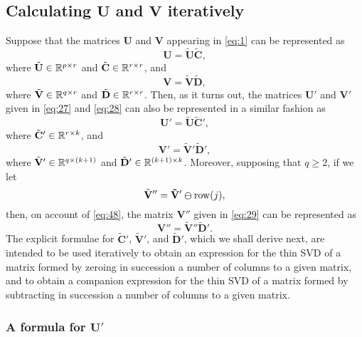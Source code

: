 \documentclass[11pt,a4paper]{article}
\theoremstyle{break}
\numberwithin{dummy}{section}
\theoremstyle{plain}
\theoremstyle{plain}
\theoremstyle{plain}
\theoremstyle{plain}
\theoremstyle{plain}
\theoremstyle{MyNonumberplain}
\newcommand{\0}{\M{0}}
\newcommand{\M}[1]{\mathbf{#1}}
\newcommand{\Mt}[1]{\tilde{\M{#1}}}
\newcommand{\R}{\mathbb{R}}
\newcommand{\Mat}[2]{%
  \ifthenelse{\equal{#2}{1}}
  {\R^{#1}}
  {\R^{#1 \times #2}}
}
\newcommand{\delrow}[2]{\M{#1} \varominus \mathrm{row}(#2)}
\begin{document}
\subsection{Calculating $\M{U}$ and $\M{V}$ iteratively}

Suppose that the matrices $\M{U}$ and $\M{V}$ appearing in \eqref{eq:1} can be represented as
\begin{equation}
  \label{eq:45}
  \M{U} = \Mt{U} \Mt{C},
\end{equation}
where $\Mt{U} \in \Mat{p}{r}$ and $\Mt{C} \in \Mat{r}{r}$, and
\begin{equation}
  \label{eq:46}
  \M{V} = \Mt{V} \Mt{D}, 
\end{equation}
where $\Mt{V} \in \Mat{q}{r}$ and $\Mt{D} \in \Mat{r}{r}$.  Then, as it turns out, the matrices $\M{U}'$ and $\M{V}'$ given in \eqref{eq:27} and \eqref{eq:28} can also be represented in a similar fashion as
\begin{equation}
  \label{eq:47}
  \M{U}' = \Mt{U} \Mt{C}', 
\end{equation}
where $\Mt{C}' \in \Mat{r}{k}$, and
\begin{equation}
  \label{eq:48}
  \M{V}' = \Mt{V}' \Mt{D}', 
\end{equation}
where $\Mt{V}' \in \Mat{q}{(k+1)}$ and $\Mt{D}' \in \Mat{(k+1)}{k}$.  Moreover, supposing that $q \geq 2$, if we let
\begin{equation}
  \label{eq:49}
  \Mt{V}'' =  \delrow{\Mt{V}'}{j},
\end{equation}
then, on account of \eqref{eq:48}, the matrix $\M{V}''$ given in \eqref{eq:29} can be represented as
\begin{equation}
  \label{eq:50}
  \M{V}''= \Mt{V}'' \Mt{D}'.
\end{equation}
The explicit formulae for $\Mt{C}'$, $\Mt{V}'$, and $\Mt{D}'$, which we shall derive next, are intended to be used iteratively to obtain an expression for the thin SVD of a matrix formed by zeroing in succession a number of columns to a given matrix, and to obtain a companion expression for the thin SVD of a matrix formed by subtracting in succession a number of columns to a given matrix.

\subsubsection{A formula for $\M{U}'$}
\end{document}
